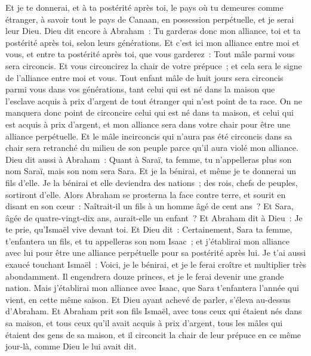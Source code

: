 \begin{multicols}{2}
Et je te donnerai, et à ta postérité après toi, le pays où tu demeures comme étranger, à savoir tout le pays de Canaan, en possession perpétuelle, et je serai leur Dieu.
Dieu dit encore à Abraham~: Tu garderas donc mon alliance, toi et ta postérité après toi, selon leurs générations.
Et c'est ici mon alliance entre moi et vous, et entre ta postérité après toi, que vous garderez~: Tout mâle parmi vous sera circoncis.
Et vous circoncirez la chair de votre prépuce~; et cela sera le signe de l'alliance entre moi et vous.
Tout enfant mâle de huit jours sera circoncis parmi vous dans vos générations, tant celui qui est né dans la maison que l'esclave acquis à prix d'argent de tout étranger qui n'est point de ta race.
On ne manquera donc point de circoncire celui qui est né dans ta maison, et celui qui est acquis à prix d'argent, et mon alliance sera dans votre chair pour être une alliance perpétuelle.
Et le mâle incirconcis qui n'aura pas été circoncis dans sa chair sera retranché du milieu de son peuple parce qu'il aura violé mon alliance.
Dieu dit aussi à Abraham~: Quant à Saraï, ta femme, tu n'appelleras plus son nom Saraï, mais son nom sera Sara.
Et je la bénirai, et même je te donnerai un fils d'elle. Je la bénirai et elle deviendra des nations~; des rois, chefs de peuples, sortiront d'elle.
Alors Abraham se prosterna la face contre terre, et sourit en disant en son cœur~: Naîtrait-il un fils à un homme âgé de cent ans~? Et Sara, âgée de quatre-vingt-dix ans, aurait-elle un enfant~?
Et Abraham dit à Dieu~: Je te prie, qu'Ismaël vive devant toi.
Et Dieu dit~: Certainement, Sara ta femme, t'enfantera un fils, et tu appelleras son nom Isaac~; et j'établirai mon alliance avec lui pour être une alliance perpétuelle pour sa postérité après lui.
Je t'ai aussi exaucé touchant Ismaël~: Voici, je le bénirai, et je le ferai croître et multiplier très abondamment. Il engendrera douze princes, et je le ferai devenir une grande nation.
Mais j'établirai mon alliance avec Isaac, que Sara t'enfantera l'année qui vient, en cette même saison.
Et Dieu ayant achevé de parler, s'éleva au-dessus d'Abraham.
Et Abraham prit son fils Ismaël, avec tous ceux qui étaient nés dans sa maison, et tous ceux qu'il avait acquis à prix d'argent, tous les mâles qui étaient des gens de sa maison, et il circoncit la chair de leur prépuce en ce même jour-là, comme Dieu le lui avait dit.

\end{multicols}
